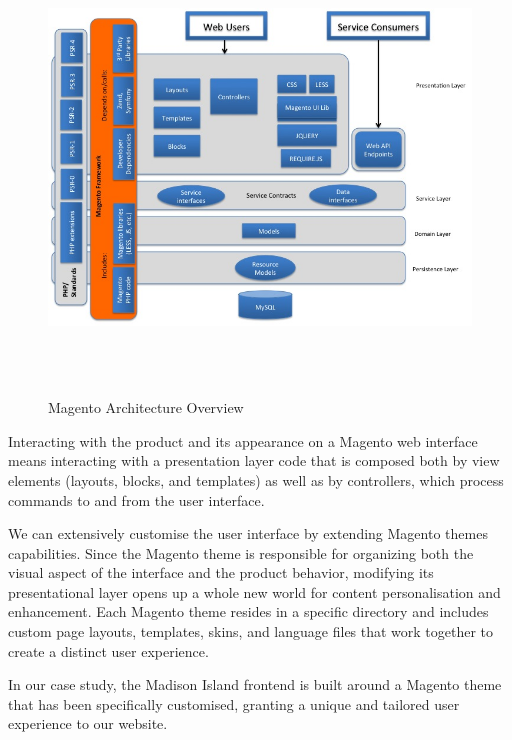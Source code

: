 \vspace{0.5cm}
\begin{figure}[H]
  \centering
    \includegraphics[height=12cm]{images/magento/magento-architecture.jpg}
  \caption{Magento Architecture Overview}
  \label{fig:magento-architecture-overview}
\end{figure}
\vspace{0.5cm}

Interacting with the product and its appearance on a Magento web interface means interacting with a presentation layer code that is composed both by view elements (layouts, blocks, and templates) as well as by controllers, which process commands to and from the user interface. 

We can extensively customise the user interface by extending Magento themes capabilities. Since the Magento theme is responsible for organizing both the visual aspect of the interface and the product behavior, modifying its presentational layer opens up a whole new world for content personalisation and enhancement. Each Magento theme resides in a specific directory and includes custom page layouts, templates, skins, and language files that work together to create a distinct user experience.

In our case study, the Madison Island frontend is built around a Magento theme that has been specifically customised, granting a unique and tailored user experience to our website. 

